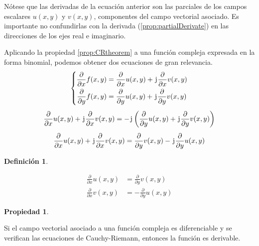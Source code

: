 \documentclass[a5paper,12pt,twoside]{book}
\newtheorem{defn}{{Definición}}[chapter]
\newtheorem{prop}{{Propiedad}}[chapter]
\begin{document}
Nótese que las derivadas de la ecuación anterior son las parciales de los campos escalares $u(x,y)$ y $v(x,y)$, componentes del campo vectorial asociado.
Es importante no confundirlas con la derivada (\ref{prop:partialDerivate}) en las direcciones de los ejes real e imaginario.

Aplicando la propiedad \ref{prop:CRtheorem} a una función compleja expresada en la forma binomial, podemos obtener dos ecuaciones de gran relevancia.
\begin{gather*}
    \left\{
    \begin{aligned}
        \frac{\partial}{\partial x} f(x,y) &= \frac{\partial}{\partial x} u(x,y) + \mkern2mu\mathrm{j}\mkern1mu \frac{\partial}{\partial x} v(x,y)
        \\
        \frac{\partial}{\partial y} f(x,y) &= \frac{\partial}{\partial y} u(x,y) + \mkern2mu\mathrm{j}\mkern1mu \frac{\partial}{\partial y} v(x,y)
    \end{aligned}
    \right.
    \\[1ex]
    \frac{\partial}{\partial x} u(x,y) + \mkern2mu\mathrm{j}\mkern1mu \frac{\partial}{\partial x} v(x,y) = - \mkern2mu\mathrm{j}\mkern1mu \left( \frac{\partial}{\partial y} u(x,y) + \mkern2mu\mathrm{j}\mkern1mu \frac{\partial}{\partial y} v(x,y) \right)
    \\[1ex]
    \frac{\partial}{\partial x} u(x,y) + \mkern2mu\mathrm{j}\mkern1mu \frac{\partial}{\partial x} v(x,y) = \frac{\partial}{\partial y} v(x,y) - \mkern2mu\mathrm{j}\mkern1mu \frac{\partial}{\partial y} u(x,y)
\end{gather*}

\begin{mdframed}[style=DefinitionFrame]
    \begin{defn}
        \label{defn:CRequations}
    \end{defn}
    \begin{align*}
        \frac{\partial}{\partial x} u(x,y) &= \frac{\partial}{\partial y} v(x,y)
        \\[1em]
        \frac{\partial}{\partial x} v(x,y) &= - \frac{\partial}{\partial y} u(x,y)
    \end{align*}
\end{mdframed}

\begin{mdframed}[style=PropertyFrame]
    \begin{prop}
    \end{prop}
    Si el campo vectorial asociado a una función compleja es diferenciable y se verifican las ecuaciones de Cauchy-Riemann, entonces la función es derivable.
\end{mdframed}
\end{document}
